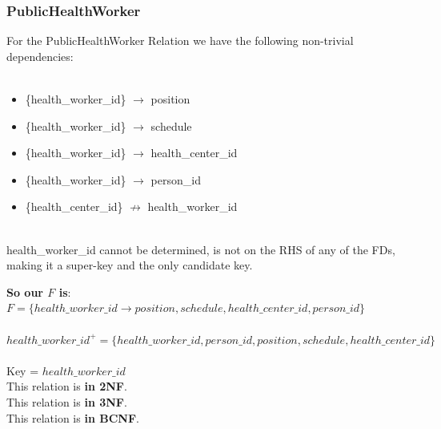 \documentclass{article}
\begin{document}
\subsubsection{PublicHealthWorker}
For the PublicHealthWorker Relation we have the following non-trivial dependencies:\\
\\
\begin{minipage}{\textwidth}
\begin{itemize}
    \item \{health\_worker\_id\} $\rightarrow$ position
    \item\{health\_worker\_id\}  $\rightarrow$ schedule
    \item \{health\_worker\_id\}  $\rightarrow$ health\_center\_id
    \item \{health\_worker\_id\}  $\rightarrow$ person\_id
    \item \{health\_center\_id\}  $\not \rightarrow$ health\_worker\_id\\
\end{itemize}
\end{minipage}
\\
health\_worker\_id cannot be determined, is not on the RHS of any of the FDs, making it a super-key and the only candidate key.
\begin{tcolorbox}
    \textbf{So our $F$ is}:
$F = \{health\_worker\_id \rightarrow position, schedule, health\_center\_id, person\_id\}$\\
\\
$health\_worker\_id^+ = \{health\_worker\_id, person\_id, position, schedule, health\_center\_id \}$\\
\\
Key = $health\_worker\_id$\\
This relation is \textbf{in 2NF}.\\
This relation is \textbf{in 3NF}.\\
This relation is \textbf{in BCNF}.
\end{tcolorbox}
\end{document}
